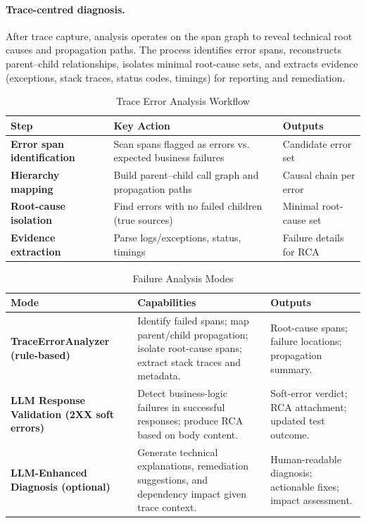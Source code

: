 \documentclass[conference]{IEEEtran}
\begin{document}
\paragraph{Trace-centred diagnosis.}
After trace capture, analysis operates on the span graph to reveal technical root causes and propagation paths. The process identifies error spans, reconstructs parent--child relationships, isolates minimal root-cause sets, and extracts evidence (exceptions, stack traces, status codes, timings) for reporting and remediation.

\begin{table}[t]
\centering
\caption{Trace Error Analysis Workflow}
\label{tab:trace-workflow}
\renewcommand{\arraystretch}{1.15}\setlength{\tabcolsep}{6pt}
\begin{tabularx}{\textwidth}{>{\bfseries}p{} X p{}}
\toprule
Step & Key Action & Outputs \\
\midrule
Error span identification & Scan spans flagged as errors vs. expected business failures & Candidate error set \\
Hierarchy mapping & Build parent--child call graph and propagation paths & Causal chain per error \\
Root-cause isolation & Find errors with no failed children (true sources) & Minimal root-cause set \\
Evidence extraction & Parse logs/exceptions, status, timings & Failure details for RCA \\
\bottomrule
\end{tabularx}
\end{table}

\begin{table}[t]
\centering
\caption{Failure Analysis Modes}
\label{tab:analysis-modes}
\renewcommand{\arraystretch}{1.15}\setlength{\tabcolsep}{6pt}
\begin{tabularx}{\textwidth}{>{\bfseries}p{} X p{}}
\toprule
Mode & Capabilities & Outputs \\
\midrule
TraceErrorAnalyzer (rule-based) & Identify failed spans; map parent/child propagation; isolate root-cause spans; extract stack traces and metadata. & Root-cause spans; failure locations; propagation summary. \\
LLM Response Validation (2XX soft errors) & Detect business-logic failures in successful responses; produce RCA based on body content. & Soft-error verdict; RCA attachment; updated test outcome. \\
LLM-Enhanced Diagnosis (optional) & Generate technical explanations, remediation suggestions, and dependency impact given trace context. & Human-readable diagnosis; actionable fixes; impact assessment. \\
\bottomrule
\end{tabularx}
\end{table}
\end{document}
